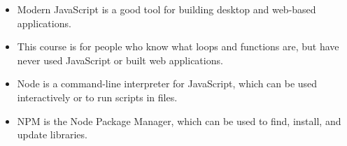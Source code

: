 \begin{itemize}
\item
  Modern JavaScript is a good tool for building desktop and web-based applications.
\item
  This course is for people who know what loops and functions are, but have never used JavaScript or built web applications.
\item
  Node is a command-line interpreter for JavaScript, which can be used interactively or to run scripts in files.
\item
  NPM is the Node Package Manager, which can be used to find, install, and update libraries.
\end{itemize}
